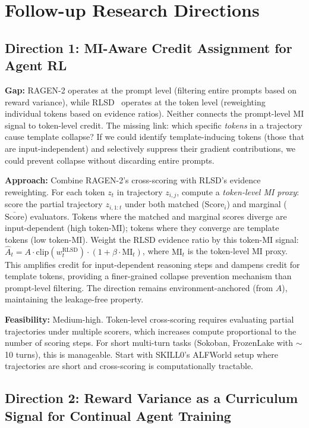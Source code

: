 \documentclass[11pt]{article}
\begin{document}
\section{Follow-up Research Directions}

\subsection{Direction 1: MI-Aware Credit Assignment for Agent RL}

\textbf{Gap:} RAGEN-2 operates at the prompt level (filtering entire prompts based on reward variance), while RLSD~\cite{rlsd} operates at the token level (reweighting individual tokens based on evidence ratios). Neither connects the prompt-level MI signal to token-level credit. The missing link: which specific \textit{tokens} in a trajectory cause template collapse? If we could identify template-inducing tokens (those that are input-independent) and selectively suppress their gradient contributions, we could prevent collapse without discarding entire prompts.

\textbf{Approach:} Combine RAGEN-2's cross-scoring with RLSD's evidence reweighting. For each token $z_t$ in trajectory $z_{i,j}$, compute a \textit{token-level MI proxy}: score the partial trajectory $z_{i,1:t}$ under both matched ($\mathrm{Score}_i$) and marginal ($\bar{\mathrm{Score}}$) evaluators. Tokens where the matched and marginal scores diverge are input-dependent (high token-MI); tokens where they converge are template tokens (low token-MI). Weight the RLSD evidence ratio by this token-MI signal:
$\hat{A}_t = A \cdot \mathrm{clip}(w_t^{\mathrm{RLSD}}) \cdot (1 + \beta \cdot \mathrm{MI}_t)$,
where $\mathrm{MI}_t$ is the token-level MI proxy. This amplifies credit for input-dependent reasoning steps and dampens credit for template tokens, providing a finer-grained collapse prevention mechanism than prompt-level filtering. The direction remains environment-anchored (from $A$), maintaining the leakage-free property.

\textbf{Feasibility:} Medium-high. Token-level cross-scoring requires evaluating partial trajectories under multiple scorers, which increases compute proportional to the number of scoring steps. For short multi-turn tasks (Sokoban, FrozenLake with $\sim$10 turns), this is manageable. Start with SKILL0's ALFWorld setup where trajectories are short and cross-scoring is computationally tractable.

\subsection{Direction 2: Reward Variance as a Curriculum Signal for Continual Agent Training}
\end{document}
